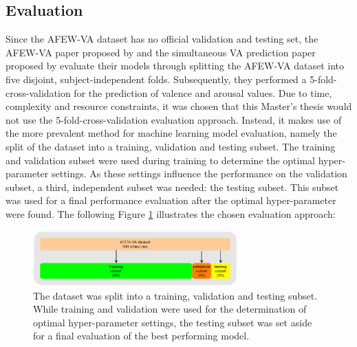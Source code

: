 \subsection{Evaluation} \label{sec:TrainValTestSplit}
Since the AFEW-VA dataset has no official validation and testing set, the AFEW-VA paper proposed by \citet{Kossaifi:2017:AFEW-VADatabase} and the simultaneous VA prediction paper proposed by \citet{Handrich:2020:SimultaneousPredVA} evaluate their models through splitting the AFEW-VA dataset into five disjoint, subject-independent folds. Subsequently, they performed a 5-fold-cross-validation for the prediction of valence and arousal values. 
\newline\newline
Due to time, complexity and resource constraints, it was chosen that this Master's thesis would not use the 5-fold-cross-validation evaluation approach. Instead, it makes use of the more prevalent method for machine learning model evaluation, namely the split of the dataset into a training, validation and testing subset. The training and validation subset were used during training to determine the optimal hyper-parameter settings. As these settings influence the performance on the validation subset, a third, independent subset was needed: the testing subset. This subset was used for a final performance evaluation after the optimal hyper-parameter were found.
\newline\newline
The following Figure \ref{fig:TrainValTestSplit} illustrates the chosen evaluation approach:

\begin{figure}[H]
  \begin{center}
  \includegraphics[angle=0, width=0.7\textwidth]{Figures/TrainValTestSplit.png}
  \caption[Dataset training-validation-test split]{The dataset was split into a training, validation and testing subset. While training and validation were used for the determination of optimal hyper-parameter settings, the testing subset was set aside for a final evaluation of the best performing model.}
  \label{fig:TrainValTestSplit}
  \end{center}
\end{figure}

